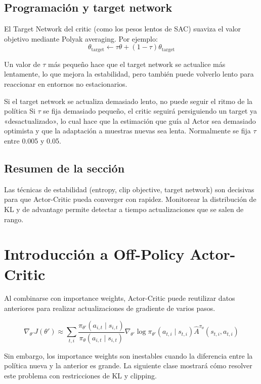\documentclass[a4paper]{article}
\begin{document}
\subsection{Programación y target network}

El Target Network del critic (como los pesos lentos de SAC) suaviza el valor objetivo mediante Polyak averaging. Por ejemplo:
$$\theta_{\text{target}} \leftarrow \tau \theta + (1 - \tau) \theta_{\text{target}}$$

Un valor de $\tau$ más pequeño hace que el target network se actualice más lentamente, lo que mejora la estabilidad, pero también puede volverlo lento para reaccionar en entornos no estacionarios.

\begin{warningbox}{Si el target network se actualiza demasiado lento, no puede seguir el ritmo de la política}
Si $\tau$ se fija demasiado pequeño, el critic seguirá persiguiendo un target ya «desactualizado», lo cual hace que la estimación que guía al Actor sea demasiado optimista y que la adaptación a muestras nuevas sea lenta. Normalmente se fija $\tau$ entre 0.005 y 0.05.
\end{warningbox}

\subsection{Resumen de la sección}

Las técnicas de estabilidad (entropy, clip objective, target network) son decisivas para que Actor-Critic pueda converger con rapidez. Monitorear la distribución de KL y de advantage permite detectar a tiempo actualizaciones que se salen de rango.

\section{Introducción a Off-Policy Actor-Critic}

Al combinarse con importance weights, Actor-Critic puede reutilizar datos anteriores para realizar actualizaciones de gradiente de varios pasos.

$$\nabla_{\theta'} J(\theta') \approx \sum_{t,i} \frac{\pi_{\theta'}(a_{i,t} \mid s_{i,t})}{\pi_\theta(a_{i,t} \mid s_{i,t})} \nabla_{\theta'} \log \pi_{\theta'}(a_{t,i} \mid s_{t,i}) \hat{A}^{\pi_\theta}(s_{t,i}, a_{t,i})$$

Sin embargo, los importance weights son inestables cuando la diferencia entre la política nueva y la anterior es grande. La siguiente clase mostrará cómo resolver este problema con restricciones de KL y clipping.
\end{document}

